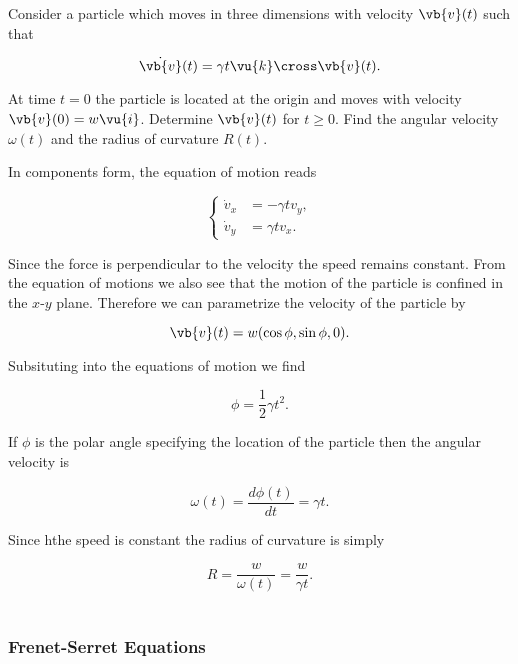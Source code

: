 \documentclass[english,a4paper,12pt]{report}
\begin{document}
{Consider a particle which moves in three dimensions with velocity \(\vb{v} (t)\) such that 

\begin{equation}
	\dot{\vb{v} }(t) = \gamma t \vu{k} \cross \vb{v} (t). 
\end{equation}

At time \(t = 0\) the particle is located at the origin and moves with velocity \(\vb{v} (0) = w \vu{i} \). Determine \(\vb{v} (t)\) for \(t \ge 0\). Find the angular velocity \(\omega (t)\) and the radius of curvature \(R(t)\).      
}
{In components form, the equation of motion reads

\begin{equation}
	\begin{cases}
		\dot{v}_{x} &= -\gamma tv_{y},\\
		\dot{v}_{y} &= \gamma t v_{x}.
	\end{cases}
\end{equation}

Since the force is perpendicular to the velocity the speed remains constant. From the equation of motions we also see that the motion of the particle is confined in the \(x\)-\(y\) plane. Therefore we can parametrize the velocity of the particle by 

\begin{equation}
	\vb{v} (t) = w (\cos \phi , \sin \phi ,0).
\end{equation}

Subsituting into the equations of motion we find 

\begin{equation}
	\phi = \frac{1}{2}\gamma t^2. 
\end{equation}

If \(\phi \) is the polar angle specifying the location of the particle then the angular velocity is 

\begin{equation}
	\omega (t) = \frac{d\phi (t)}{dt} = \gamma t. 
\end{equation}

Since hthe speed is constant the radius of curvature is simply 

\begin{equation}
	R = \frac{w}{\omega (t)} = \frac{w}{\gamma t}.  
\end{equation}
~
} 


\subsubsection{Frenet-Serret Equations}
\end{document}
